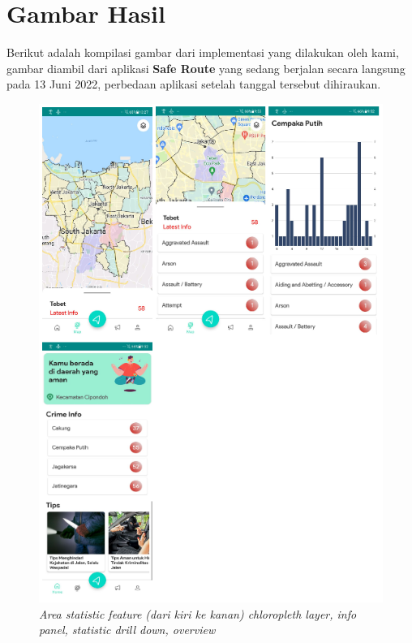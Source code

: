 \section*{Gambar Hasil}

Berikut adalah kompilasi gambar dari implementasi yang dilakukan oleh kami, gambar diambil dari aplikasi \textbf{Safe Route} yang sedang berjalan secara langsung pada 13 Juni 2022, perbedaan aplikasi setelah tanggal tersebut dihiraukan.


\begin{figure}
    \centering
    \includegraphics[width=\textwidth]{chapters/images/stats.png}
    \caption{\textit{Area statistic feature (dari kiri ke kanan) chloropleth layer, info panel, statistic drill down, overview}}
    \label{fig:gambar8.1}
\end{figure}

